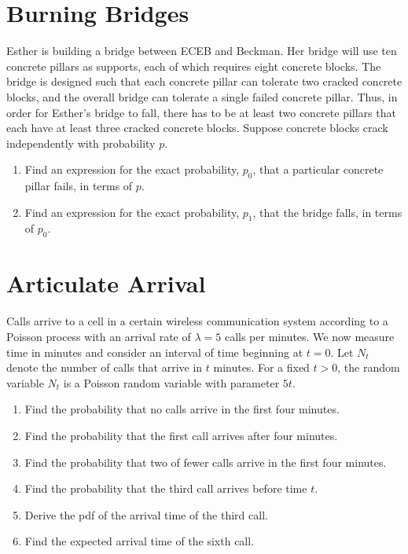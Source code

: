 \documentclass{article}
\begin{document}
\section{Burning Bridges}

Esther is building a bridge between ECEB and Beckman. Her bridge will use ten concrete pillars as supports, each of which requires eight concrete blocks. The bridge is designed such that each concrete pillar can tolerate two cracked concrete blocks, and the overall bridge can tolerate a single failed concrete pillar. Thus, in order for Esther's bridge to fall, there has to be at least two concrete pillars that each have at least three cracked concrete blocks. Suppose concrete blocks crack independently with probability $p$.

\begin{enumerate}[label=(\alph*)]
\itemsep0em
    \item Find an expression for the exact probability, $p_0$, that a particular concrete pillar fails, in terms of $p$.\vfill
    \item Find an expression for the exact probability, $p_1$, that the bridge falls, in terms of $p_0$.\vfill
\end{enumerate}

\newpage

\section{Articulate Arrival}

Calls arrive to a cell in a certain wireless communication system according to a Poisson process with an arrival rate of $\lambda = 5$ calls per minutes. We now measure time in minutes and consider an interval of time beginning at $t = 0$. Let $N_t$ denote the number of calls that arrive in $t$ minutes. For a fixed $t > 0$, the random variable $N_t$ is a Poisson random variable with parameter $5t$.

\begin{enumerate}[label=(\alph*)]
\itemsep0em
    \item Find the probability that no calls arrive in the first four minutes.\vfill
    \item Find the probability that the first call arrives after four minutes.\vfill
    \item Find the probability that two of fewer calls arrive in the first four minutes.\vfill
    \item Find the probability that the third call arrives before time $t$.\vfill
    \item Derive the pdf of the arrival time of the third call.\vfill
    \item Find the expected arrival time of the sixth call.\vfill
\end{enumerate}
\end{document}
